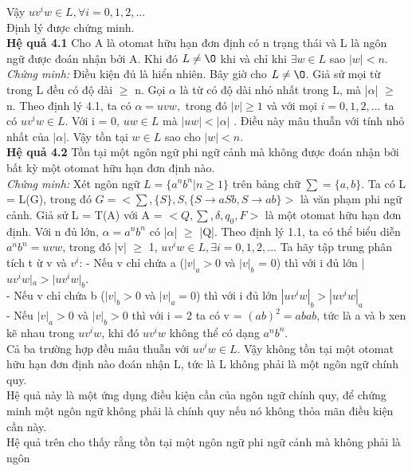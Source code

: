 \begin{flushleft}
Vậy $uv^iw \in L, \forall i = 0, 1, 2,...$\\
Định lý được chứng minh.\\
\textbf{Hệ quả 4.1}  Cho A là otomat hữu hạn đơn định có n trạng thái và L là ngôn ngữ được đoán
nhận bởi A. Khi đó $L \ne \O$ khi và chỉ khi $\exists w \in L$ sao $|w| < n.$\\
\textit{Chứng minh:} Điều kiện đủ là hiển nhiên. Bây giờ cho $L \ne \O$. Giả sử mọi từ trong L đều có độ
dài $\ge$ n. Gọi $\alpha$ là từ có độ dài nhỏ nhất trong L, mà |$\alpha$| $\ge$ n. Theo định lý 4.1, ta có $\alpha = uvw,$
trong đó $|v| \ge 1$ và với mọi $i = 0, 1, 2,...$ ta có $uv^iw \in L$. Với i = 0, $uw \in L$ mà $|uw| < |\alpha|$ . Điều
này mâu thuẫn với tính nhỏ nhất của $|\alpha|$. Vậy tồn tại $w \in L$ sao cho $|w| < n.$\\
\textbf{Hệ quả 4.2} Tồn tại một ngôn ngữ phi ngữ cảnh mà không được đoán nhận bởi bất kỳ một
otomat hữu hạn đơn định nào.\\
\textit{Chứng minh:} Xét ngôn ngữ $L = \{a^nb^n | n \ge 1\}$ trên bảng chữ $\sum = \{a, b\}$. Ta có L = L(G), trong
đó $G = <\sum, \{S\}, S, \{S \to aSb, S \to ab\}>$ là văn phạm phi ngữ cảnh. Giả sử L = T(A) với A =
$<Q, \sum, \delta, q_0, F>$ là một otomat hữu hạn đơn định. Với n đủ lớn, $\alpha = a^nb^n$ có |$\alpha$| $\ge$ |Q|. Theo
định lý 1.1, ta có thể biểu diễn $a^nb^n = uvw$, trong đó |v| $\ge$ 1, $uv^iw \in L, \exists i = 0, 1, 2,...$ Ta hãy tập
trung phân tích t ừ v và $v^i$:
\hspace{10mm} - Nếu v chỉ chứa a ($|v|_a >0$ và $|v|_b$ = 0) thì với i đủ lớn |$uv^i w |_a > | uv^i w|_b.$\\
\hspace{10mm} - Nếu v chỉ chứa b ($|v|_b >0$ và $|v|_a = 0$) thì với i đủ lớn $| uv^i w |_b > |uv^i w|_a$\\
\hspace{10mm} - Nếu $|v|_a >0$ và $|v|_b > 0 $ thì với i = 2 ta có v = $(ab)^2 = abab$, tức là a và b xen kẽ nhau
trong $uv^iw$, khi đó $uv^iw$ không thể có dạng $a^nb^n$.\\
Cả ba trường hợp đều mâu thuẫn với $uv^iw \in L$. Vậy không tồn tại một otomat hữu hạn đơn
định nào đoán nhận L, tức là L không phải là một ngôn ngữ chính quy.\\
Hệ quả này là một ứng dụng điều kiện cần của ngôn ngữ chính quy, để chứng minh
một ngôn ngữ không phải là chính quy nếu nó không thỏa mãn điều kiện cần này.\\
Hệ quả trên cho thấy rằng tồn tại một ngôn ngữ phi ngữ cảnh mà không phải là ngôn

\end{flushleft}
